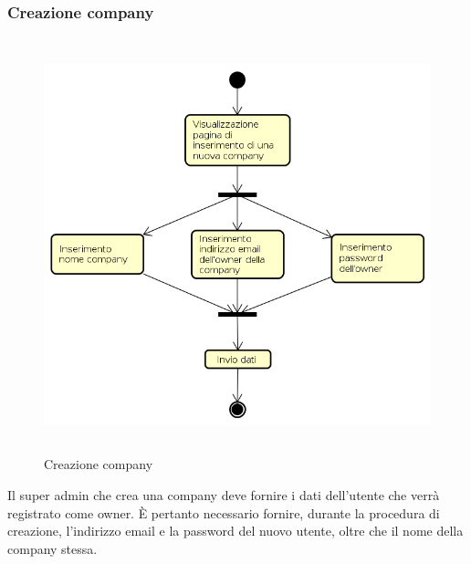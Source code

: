 \subsubsection{Creazione company}
\begin{figure}[H]
\begin{center}
\includegraphics[height=12cm]{res/sections/backend/activities/creazioneCompanySA.png}
\caption{Creazione company}
\end{center}
\end{figure}
Il super admin che crea una company deve fornire i dati dell'utente che verrà registrato come owner. È pertanto necessario fornire, durante la procedura di creazione, l'indirizzo email e la password del nuovo utente, oltre che il nome della company stessa.
